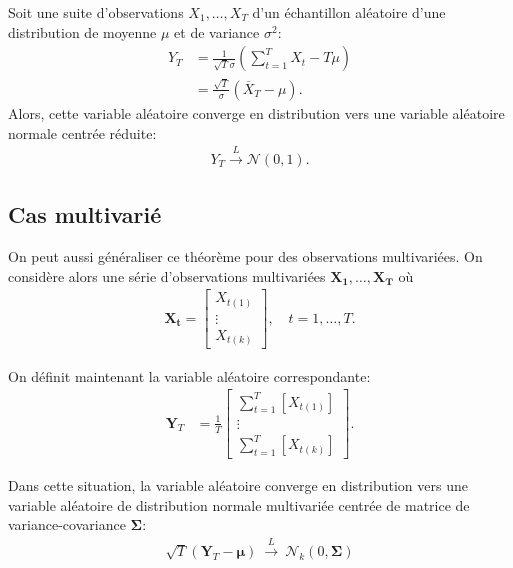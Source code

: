 Soit une suite d'observations $X_1, \ldots, X_T$ d'un échantillon
aléatoire d'une distribution de moyenne $\mu$ et de variance
$\sigma^2$:
\begin{align}
  \label{eq:TCL}
  Y_T &= \frac{1}{\sqrt{T}\sigma} \left(\sum_{t=1}^T X_t - T\mu\right) \nonumber\\
  &= \frac{\sqrt{T}}{\sigma}\left(\overline{X}_T-\mu\right).
\end{align}
Alors, cette variable aléatoire converge en distribution vers une
variable aléatoire normale centrée réduite:
\begin{align}
  \label{eq:TCL2}
  Y_T \stackrel{L}{\rightarrow} \mathcal{N}(0,1).
\end{align}

\subsection{Cas multivarié}
\label{sec:cas-multivarie}

On peut aussi généraliser ce théorème pour des observations
multivariées. On considère alors une série d'observations
multivariées $\mathbf{X_1}, \ldots, \mathbf{X_T}$ où
\begin{align}
  \label{eq:defmultiX}
  \mathbf{X_t}=\begin{bmatrix} X_{t(1)} \\ \vdots \\
    X_{t(k)} \end{bmatrix}, \quad t=1,\ldots,T.
\end{align}

On définit maintenant la variable aléatoire correspondante:
\begin{align}
  \label{eq:TCLmulti1}
  \mathbf{Y}_T &= \frac{1}{T}\begin{bmatrix} \sum_{t=1}^{T} \left [
      X_{t(1)} \right ] \\ \vdots \\ \sum_{t=1}^{T} \left [ X_{t(k)}
    \right ] \end{bmatrix}.
\end{align}

Dans cette situation, la variable aléatoire converge en distribution
vers une variable aléatoire de distribution normale multivariée
centrée de matrice de variance-covariance $\mathbf{\Sigma}$:
\begin{align}
  \label{eq:TCLmulti2}
  \sqrt{T}\left(\mathbf{Y}_T - \boldsymbol{\mu}\right)\ \stackrel{L}{\rightarrow}\
  \mathcal{N}_k(0,\mathbf{\Sigma})
\end{align}

